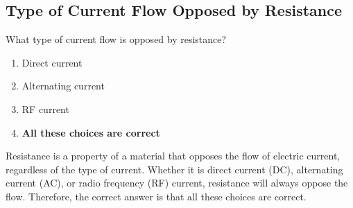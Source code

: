 \subsection{Type of Current Flow Opposed by Resistance}
\label{T5A11}

\begin{tcolorbox}[colback=gray!10!white,colframe=black!75!black,title=T5A11]
What type of current flow is opposed by resistance?
\begin{enumerate}[noitemsep]
    \item Direct current
    \item Alternating current
    \item RF current
    \item \textbf{All these choices are correct}
\end{enumerate}
\end{tcolorbox}

Resistance is a property of a material that opposes the flow of electric current, regardless of the type of current. Whether it is direct current (DC), alternating current (AC), or radio frequency (RF) current, resistance will always oppose the flow. Therefore, the correct answer is that all these choices are correct.
